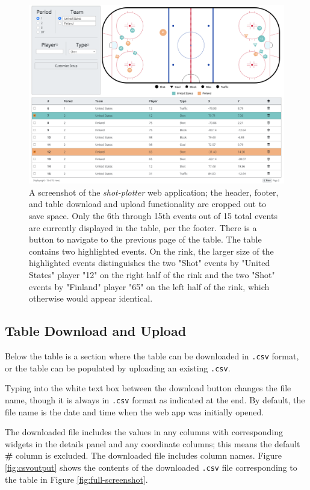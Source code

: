 \documentclass[letterpaper]{article}
\begin{document}
\begin{figure}[h!]
	\centering
	\includegraphics[width=1\linewidth]{images/highlighting}
	\caption{A screenshot of the \textit{shot-plotter} web application; the header, footer, and table download and upload functionality are cropped out to save space. Only the 6th through 15th events out of 15 total events are currently displayed in the table, per the footer. There is a button to navigate to the previous page of the table. The table contains two highlighted events. On the rink, the larger size of the highlighted events distinguishes the two "Shot" events by "United States" player "12" on the right half of the rink and the two "Shot" events by "Finland" player "65" on the left half of the rink, which otherwise would appear identical.}
		\label{fig:highlighting}
\end{figure}

\subsection{Table Download and Upload}\label{table-up-down}
Below the table is a section where the table can be downloaded in \texttt{.csv} format, or the table can be populated by uploading an existing \texttt{.csv}.

Typing into the white text box between the download button changes the file name, though it is always in \texttt{.csv} format as indicated at the end. By default, the file name is the date and time when the web app was initially opened.

The downloaded file includes the values in any columns with corresponding widgets in the details panel and any coordinate columns; this means the default \textbf{\#} column is excluded. The downloaded file includes column names. Figure \ref{fig:csvoutput} shows the contents of the downloaded \texttt{.csv} file corresponding to the table in Figure \ref{fig:full-screenshot}.
\end{document}
